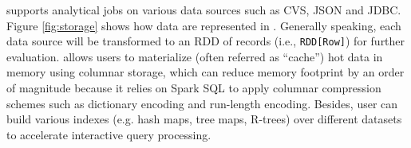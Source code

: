 \name supports analytical jobs on various data sources such as CVS,
JSON and JDBC. Figure \ref{fig:storage} shows how data are represented
in \name.  Generally speaking, each data source will be transformed to
an RDD of records (i.e., \texttt{RDD[Row]}) for further
evaluation. \name allows users to materialize (often referred as
``cache'') hot data in memory using columnar storage, which can reduce
memory footprint by an order of magnitude because it relies on Spark
SQL to apply columnar compression schemes such as dictionary encoding
and run-length encoding. Besides, user can build various indexes
(e.g. hash maps, tree maps, R-trees) over different datasets to
accelerate interactive query processing.


